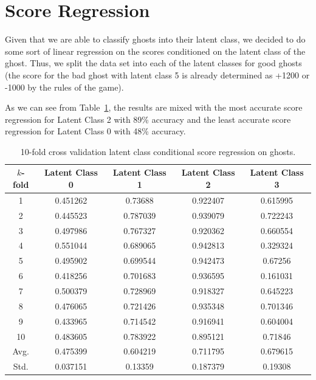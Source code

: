 \documentclass[11pt]{amsart}
\begin{document}
\section{Score Regression}

Given that we are able to classify ghosts into their latent class, we decided to do some sort of linear regression on the scores conditioned on the latent class of the ghost. Thus, we split the data set into each of the latent classes for good ghosts (the score for the bad ghost with latent class 5 is already determined as +1200 or -1000 by the rules of the game). 

As we can see from Table~\ref{table:score}, the results are mixed with the most accurate score regression for Latent Class 2 with 89\% accuracy and the least accurate score regression for Latent Class 0 with 48\% accuracy.

\begin{table}[t]
\caption{10-fold cross validation latent class conditional score regression on ghosts.}
\centering
\begin{tabular}{c  c  c  c  c}
\hline \hline
$k$-fold & Latent Class 0 & Latent Class 1 & Latent Class 2 & Latent Class 3 \\ [0.5ex]
\hline
1 & 0.451262 & 0.73688 & 0.922407 & 0.615995 \\
2 & 0.445523 & 0.787039 & 0.939079 & 0.722243 \\
3 & 0.497986 & 0.767327 & 0.920362 & 0.660554 \\
4 & 0.551044 & 0.689065 & 0.942813 & 0.329324 \\
5 & 0.495902 & 0.699544 & 0.942473 & 0.67256 \\
6 & 0.418256 & 0.701683 & 0.936595 & 0.161031 \\
7 & 0.500379 & 0.728969 & 0.918327 & 0.645223 \\
8 & 0.476065 & 0.721426 & 0.935348 & 0.701346 \\
9 & 0.433965 & 0.714542 & 0.916941 & 0.604004 \\
10 & 0.483605 & 0.783922 & 0.895121 & 0.71846 \\
\hline
Avg. & 0.475399 & 0.604219 & 0.711795 & 0.679615 \\
Std. & 0.037151 & 0.13359 & 0.187379 & 0.19308 \\
\hline
\end{tabular}
\label{table:score}
\end{table}
\end{document}
